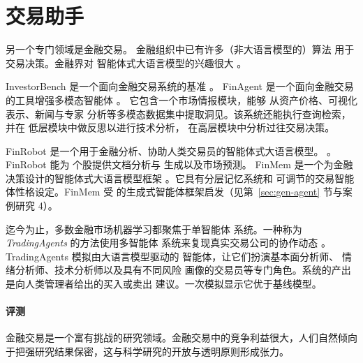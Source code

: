






\section{交易助手}
另一个专门领域是金融交易。
金融组织中已有许多（非大语言模型的）算法
用于交易决策。金融界对
智能体式大语言模型的兴趣很大 \citep{ding2024large}。

InvestorBench 是一个面向金融交易系统的基准 \citep{li2024investorbench}。
%
FinAgent 是一个面向金融交易的工具增强多模态智能体
\citep{zhang2024finagent}。
它包含一个市场情报模块，能够
从资产价格、可视化表示、新闻与专家
分析等多模态数据集中提取洞见。该系统还能执行查询检索，并在
低层模块中做反思以进行技术分析，
在高层模块中分析过往交易决策。

FinRobot 是一个用于金融分析、协助人类交易员的智能体式大语言模型。
\citep{yang2024finrobot}。FinRobot 能为
个股提供文档分析与
生成以及市场预测。
%
FinMem 是一个为金融决策设计的智能体式大语言模型框架
\citep{yu2024finmem}。它具有分层记忆系统和
可调节的交易智能体性格设定。FinMem 受
\citet{park2023generative} 的生成式智能体框架启发（见第~\ref{sec:gen-agent} 节与案例研究 4）。

迄今为止，多数金融市场机器学习都聚焦于单智能体
系统。一种称为 {\em TradingAgents} 的方法使用多智能体
系统来复现真实交易公司的协作动态
\citep{xiao2024tradingagents}。TradingAgents 模拟由大语言模型驱动的
智能体，让它们扮演基本面分析师、
情绪分析师、技术分析师以及具有不同风险
画像的交易员等专门角色。系统的产出是向人类管理者给出的买入或卖出
建议。一次模拟显示它优于基线模型。

\paragraph{评测} 金融交易是一个富有挑战的研究领域。金融交易中的竞争利益很大，人们自然倾向于把强研究结果保密，这与科学研究的开放与透明原则形成张力。

